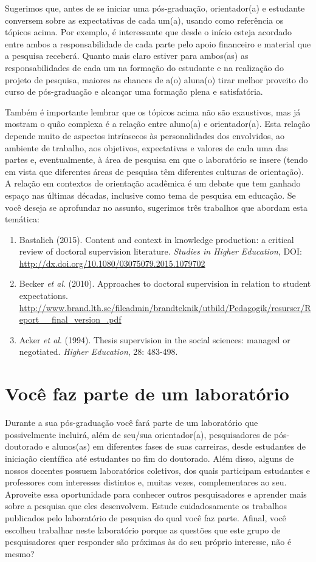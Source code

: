 Sugerimos que, antes de se iniciar uma pós-graduação, orientador(a) e
estudante conversem sobre as expectativas de cada um(a), usando como
referência os tópicos acima. Por exemplo, é interessante que desde o
início esteja acordado entre ambos a responsabilidade de cada parte
pelo apoio financeiro e material que a pesquisa receberá. Quanto mais
claro estiver para ambos(as) as responsabilidades de cada um na
formação do estudante e na realização do projeto de pesquisa, maiores
as chances de a(o) aluna(o) tirar melhor proveito do curso de
pós-graduação e alcançar uma formação plena e satisfatória.

Também é importante lembrar que os tópicos acima não são exaustivos,
mas já mostram o quão complexa é a relação entre aluno(a) e
orientador(a). Esta relação depende muito de aspectos intrínsecos às
personalidades dos envolvidos, ao ambiente de trabalho, aos objetivos,
expectativas e valores de cada uma das partes e, eventualmente, à área
de pesquisa em que o laboratório se insere (tendo em vista que
diferentes áreas de pesquisa têm diferentes culturas de
orientação). A relação em contextos de orientação acadêmica é um
debate que tem ganhado espaço nas últimas décadas, inclusive como tema
de pesquisa em educação. Se você deseja se aprofundar no assunto,
sugerimos três trabalhos que abordam esta temática:
\begin{enumerate}
\item Bastalich (2015). Content and context in knowledge production: a
  critical review of doctoral supervision literature. \textit{Studies
    in Higher Education}, DOI:
  {\url{http://dx.doi.org/10.1080/03075079.2015.1079702}}
\item Becker \textit{et al}. (2010). Approaches to doctoral
  supervision in relation to student
  expectations. {\url{http://www.brand.lth.se/fileadmin/brandteknik/utbild/Pedagogik/resurser/Report__final_version_.pdf}}
\item Acker \textit{et al}. (1994). Thesis supervision in the social
  sciences: managed or negotiated. \textit{Higher Education}, 28:
  483-498.
\end{enumerate}

\section{Você faz parte de um laboratório}

Durante a sua pós-graduação você fará parte de um laboratório que
possivelmente incluirá, além de seu/sua orientador(a), pesquisadores
de pós-doutorado e alunos(as) em diferentes fases de suas carreiras,
desde estudantes de iniciação científica até estudantes no fim do
doutorado. Além disso, alguns de nossos docentes possuem laboratórios
coletivos, dos quais participam estudantes e professores com
interesses distintos e, muitas vezes, complementares ao seu. Aproveite
essa oportunidade para conhecer outros pesquisadores e aprender mais
sobre a pesquisa que eles desenvolvem. Estude cuidadosamente os
trabalhos publicados pelo laboratório de pesquisa do qual você faz
parte. Afinal, você escolheu trabalhar neste laboratório porque as
questões que este grupo de pesquisadores quer responder são próximas
às do seu próprio interesse, não é mesmo?

